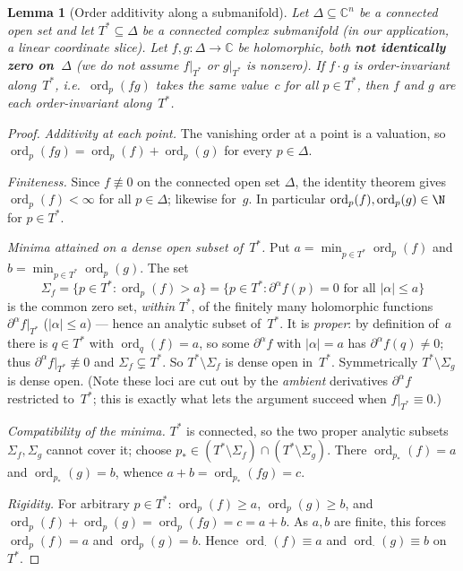 \documentclass[11pt]{article}
\theoremstyle{plain}
\newtheorem{lemma}[theorem]{Lemma}
\theoremstyle{definition}
\newcommand{\C}{\mathbb{C}}
\DeclareMathOperator{\ord}{ord}
\begin{document}
\begin{lemma}[Order additivity along a submanifold]
\label{lem:order_additivity}
Let $\Delta \subseteq \C^n$ be a connected open set and let
$T^* \subseteq \Delta$ be a connected complex submanifold (in our application,
a linear coordinate slice).  Let $f, g : \Delta \to \C$ be holomorphic, both
\textbf{not identically zero on~$\Delta$} (we do \emph{not} assume $f|_{T^*}$
or $g|_{T^*}$ is nonzero).  If $f \cdot g$ is order-invariant along~$T^*$,
i.e.\ $\ord_p(fg)$ takes the same value~$c$ for all $p \in T^*$, then $f$ and
$g$ are each order-invariant along~$T^*$.
\end{lemma}

\begin{proof}
\emph{Additivity at each point.}  The vanishing order at a point is a
valuation, so $\ord_p(fg) = \ord_p(f) + \ord_p(g)$ for every $p \in \Delta$.

\emph{Finiteness.}  Since $f \not\equiv 0$ on the connected open set
$\Delta$, the identity theorem gives $\ord_p(f) < \infty$ for all
$p \in \Delta$; likewise for~$g$.  In particular $\ord_p(f), \ord_p(g) \in \N$
for $p \in T^*$.

\emph{Minima attained on a dense open subset of~$T^*$.}  Put
$a = \min_{p \in T^*} \ord_p(f)$ and $b = \min_{p \in T^*} \ord_p(g)$.  The set
\[
  \Sigma_f = \{ p \in T^* : \ord_p(f) > a \}
           = \{ p \in T^* : \partial^\alpha f(p) = 0
                            \text{ for all } |\alpha| \le a \}
\]
is the common zero set, \emph{within} $T^*$, of the finitely many holomorphic
functions $\partial^\alpha f|_{T^*}$ ($|\alpha| \le a$) --- hence an analytic
subset of~$T^*$.  It is \emph{proper}: by definition of~$a$ there is
$q \in T^*$ with $\ord_q(f) = a$, so some $\partial^\alpha f$ with
$|\alpha| = a$ has $\partial^\alpha f(q) \ne 0$; thus
$\partial^\alpha f|_{T^*} \not\equiv 0$ and $\Sigma_f \subsetneq T^*$.  So
$T^* \setminus \Sigma_f$ is dense open in~$T^*$.  Symmetrically
$T^* \setminus \Sigma_g$ is dense open.  (Note these loci are cut out by the
\emph{ambient} derivatives $\partial^\alpha f$ restricted to~$T^*$; this is
exactly what lets the argument succeed when $f|_{T^*} \equiv 0$.)

\emph{Compatibility of the minima.}  $T^*$ is connected, so the two proper
analytic subsets $\Sigma_f, \Sigma_g$ cannot cover it; choose
$p_* \in (T^* \setminus \Sigma_f) \cap (T^* \setminus \Sigma_g)$.  There
$\ord_{p_*}(f) = a$ and $\ord_{p_*}(g) = b$, whence $a + b = \ord_{p_*}(fg) = c$.

\emph{Rigidity.}  For arbitrary $p \in T^*$: $\ord_p(f) \ge a$,
$\ord_p(g) \ge b$, and $\ord_p(f) + \ord_p(g) = \ord_p(fg) = c = a + b$.  As
$a, b$ are finite, this forces $\ord_p(f) = a$ and $\ord_p(g) = b$.  Hence
$\ord_\cdot(f) \equiv a$ and $\ord_\cdot(g) \equiv b$ on~$T^*$.
\end{proof}
\end{document}

